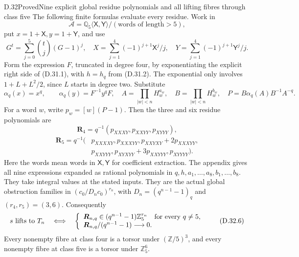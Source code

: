 \begin{statement}{D.32}{Proved}{Nine explicit global residue polynomials and all lifting fibres through class five}
The following finite formulas evaluate every
residue. Work in
\[
 \mathcal A=\mathbb Q_5\langle\mathsf X,\mathsf Y\rangle/
                 (\text{words of length}>5),
\]
put
\(x=1+\mathsf X,y=1+\mathsf Y\), and use
\[
 G^t=\sum_{j=0}^{5}\binom tj(G-1)^j,
 \quad X=\sum_{j=1}^{4}(-1)^{j+1}\mathsf X^j/j,
 \quad Y=\sum_{j=1}^{4}(-1)^{j+1}\mathsf Y^j/j.
                                                        \tag{D.32.2}
\]
Form the expression \(F\), truncated in degree
four, by exponentiating the explicit right side
of (D.31.1), with \(h=h_q\) from (D.31.2).
The exponential only involves \(1+L+L^2/2\),
since \(L\) starts in degree two. Substitute
\[
 \alpha_q(x)=x^q,\qquad
 \alpha_q(y)=F^{-1}y^qF,
 \quad A=\prod_{|w|<n}H_w^{a_w},\quad
 B=\prod_{|w|<n}H_w^{b_w},\quad
 P=B\alpha_q(A)B^{-1}A^{-q}.                    \tag{D.32.3}
\]
For a word \(w\), write \(p_w=[w](P-1)\).
Then the three and six residue polynomials are
\[
 \boldsymbol R_4=q^{-1}
       (p_{XXXY},p_{XXYY},p_{XYYY}),             \tag{D.32.4}
\]
\[
 \begin{aligned}
 \boldsymbol R_5=q^{-1}\bigl(&
 p_{XXXXY},p_{XXXYY},p_{XXYXY}+2p_{XXXYY},\\
 &p_{XXYYY},p_{XYXYY}+3p_{XXYYY},p_{XYYYY}\bigr).
 \end{aligned}                                          \tag{D.32.5}
\]
Here the words mean words in
\(\mathsf X,\mathsf Y\) for coefficient extraction.
The appendix gives all nine expressions expanded
as rational polynomials in
\(q,h,a_1,\ldots,a_8,b_1,\ldots,b_8\).
They take integral values at the stated inputs.
They are the actual global obstruction families
in \((c_0/D_nc_0)^{r_n}\), with
\(D_n=(q^{n-1}-1)_q\) and \((r_4,r_5)=(3,6)\).
Consequently
\[
 s\text{ lifts to }T_n
 \quad\Longleftrightarrow\quad
 \left\{
 \begin{array}{l}
  \boldsymbol R_{n,q}\in(q^{n-1}-1)\mathbb Z_5^{r_n}
                              \quad\hbox{for every }q\ne5,\\
  \boldsymbol R_{n,q}/(q^{n-1}-1)\longrightarrow0.
 \end{array}\right.                            \tag{D.32.6}
\]
Every nonempty fibre at class four is a torsor
under \((\mathbb Z/5)^3\), and every nonempty
fibre at class five is a torsor under
\(\mathbb Z_5^6\).
\end{statement}
